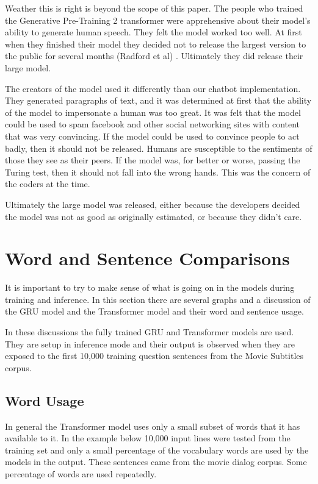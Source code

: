 Weather this is right is beyond the scope of this paper. The people who trained the Generative Pre-Training 2 transformer were apprehensive about their model's ability to generate human speech. They felt the model worked too well. At first when they finished their model they decided not to release the largest version to the public for several months (Radford et al) \cite{radford2019language}. Ultimately they did release their large model.

The creators of the model used it differently than our chatbot implementation. They generated paragraphs of text, and it was determined at first that the ability of the model to impersonate a human was too great. It was felt that the model could be used to spam facebook and other social networking sites with content that was very convincing. If the model could be used to convince people to act badly, then it should not be released. Humans are susceptible to the sentiments of those they see as their peers. If the model was, for better or worse, passing the Turing test, then it should not fall into the wrong hands. This was the concern of the coders at the time.

Ultimately the large model was released, either because the developers decided the model was not as good as originally estimated, or because they didn't care. 

\section{Word and Sentence Comparisons}

It is important to try to make sense of what is going on in the models during training and inference. In this section there are several graphs and a discussion of the GRU model and the Transformer model and their word and sentence usage.

In these discussions the fully trained GRU and Transformer models are used. They are setup in inference mode and their output is observed when they are exposed to the first 10,000 training question sentences from the Movie Subtitles corpus.

\subsection{Word Usage}

In general the Transformer model uses only a small subset of words that it has available to it. In the example below 10,000 input lines were tested from the training set and only a small percentage of the vocabulary words are used by the models in the output. These sentences came from the movie dialog corpus. Some percentage of words are used repeatedly.

